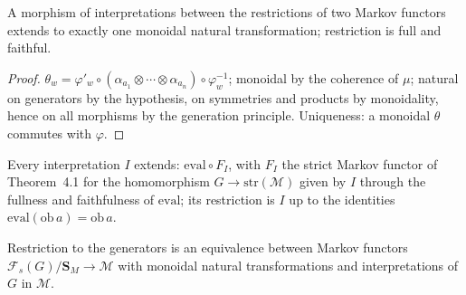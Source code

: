 \begin{theorem}
\label{s8:unique}
\leanok
{}
A morphism of interpretations between the restrictions of two Markov functors extends to exactly
one monoidal natural transformation; restriction is full and faithful.
\end{theorem}
\begin{proof}
\leanok
$\theta_w = \varphi'_w \circ (\alpha_{a_1} \otimes \cdots \otimes \alpha_{a_n}) \circ
\varphi_w^{-1}$; monoidal by the coherence of $\mu$; natural on generators by the hypothesis, on
symmetries and products by monoidality, hence on all morphisms by the generation principle.
Uniqueness: a monoidal $\theta$ commutes with $\varphi$.
\end{proof}

\begin{theorem}
\label{s8:exist}
\leanok
{}
Every interpretation $I$ extends: $\mathrm{eval} \circ F_I$, with $F_I$ the strict Markov functor of
Theorem~4.1 for the homomorphism $G \to \mathrm{str}(\mathcal M)$ given by $I$ through the
fullness and faithfulness of $\mathrm{eval}$; its restriction is $I$ up to the identities
$\mathrm{eval}(\mathrm{ob}\, a) = \mathrm{ob}\, a$.
\end{theorem}

\begin{theorem}
\label{s8:equiv}
\leanok
{}
Restriction to the generators is an equivalence between Markov functors
$\mathcal F_s(G)/\mathbf S_M \to \mathcal M$ with monoidal natural transformations and
interpretations of $G$ in $\mathcal M$.
\end{theorem}

